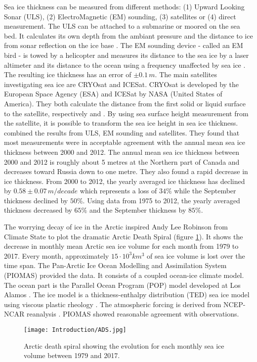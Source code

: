 Sea ice thickness can be measured from different methods: (1) Upward Looking Sonar (ULS), (2) ElectroMagnetic (EM) sounding, (3) satellites or (4) direct measurement. The ULS can be attached to a submarine or moored on the sea bed. It calculates its own depth from the ambiant pressure and the distance to ice from sonar reflection on the ice base \citep{ULS}. The EM sounding device - called an EM bird - is towed by a helicopter and measures its distance to the sea ice by a laser altimeter and its distance to the ocean using a frequency unaffected by sea ice \citep{EMbird}. The resulting ice thickness has an error of $\pm 0.1 \,m$. The main satellites investigating sea ice are CRYOsat and ICESat. CRYOsat is developed by the European Space Agency (ESA) and ICESat by NASA (United States of America). They both calculate the distance from the first solid or liquid surface to the satellite, respectively \cite{cryosat} and \cite{icesat}. By using sea surface height measurement from the satellite, it is possible to transform the sea ice height in sea ice thickness. \cite{subplusat} combined the results from ULS, EM sounding and satellites. They found that most measurements were in acceptable agreement with the annual mean sea ice thickness between 2000 and 2012. The annual mean sea ice thickness between 2000 and 2012 is roughly about 5 metres at the Northern part of Canada and decreases toward Russia down to one metre. They also found a rapid decrease in ice thickness. From 2000 to 2012, the yearly averaged ice thickness has declined by $0.58 \pm 0.07 \, m/decade$ which represents a loss of $34\%$ while the September thickness declined by $50\%$. Using data from 1975 to 2012, the yearly averaged thickness decreased by $65\%$ and the September thickness by $85\%$.

The worrying decay of ice in the Arctic inspired Andy Lee Robinson from Climate State to plot the dramatic Arctic Death Spiral (figure \ref{ads}). It shows the decrease in monthly mean Arctic sea ice volume for each month from 1979 to 2017. Every month, approximately $15\cdot 10^3 km^3$ of sea ice volume is lost over the time span. The Pan-Arctic Ice Ocean Modelling and Assimilation System (PIOMAS) provided the data. It consists of a coupled ocean-ice climate model. The ocean part is the Parallel Ocean Program (POP) model developed at Los Alamos \citep{SmithPop2010}. The ice model is a thickness-enthalpy distribution (TED) sea ice model using viscous plastic rheology \citep{PIOMAS}. The atmospheric forcing is derived from NCEP-NCAR reanalysis \citep{NCEPNCAR}.  PIOMAS showed reasonable agreement with observations.
\begin{figure}[H]
\center
\texttt{[image: Introduction/ADS.jpg]}
\caption{Arctic death spiral showing the evolution for each monthly sea ice volume between 1979 and 2017.}
\label{ads}
\end{figure}

